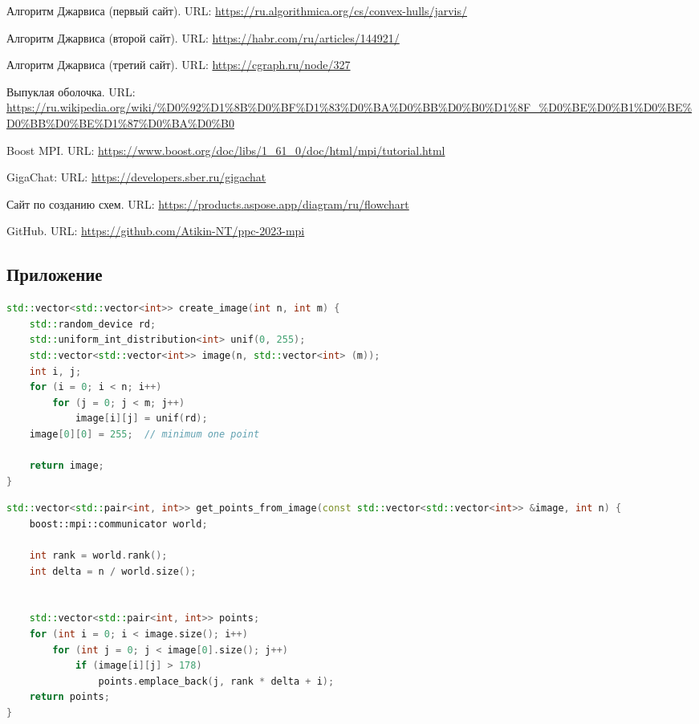 \documentclass[a4paper, 12pt]{article}
\begin{document}
\begin{thebibliography}{8}
Алгоритм Джарвиса (первый сайт). URL: \url{https://ru.algorithmica.org/cs/convex-hulls/jarvis/}

Алгоритм Джарвиса (второй сайт). URL: \url{https://habr.com/ru/articles/144921/}

Алгоритм Джарвиса (третий сайт). URL: \url{https://cgraph.ru/node/327}

Выпуклая оболочка. URL: \url{https://ru.wikipedia.org/wiki/%D0%92%D1%8B%D0%BF%D1%83%D0%BA%D0%BB%D0%B0%D1%8F_%D0%BE%D0%B1%D0%BE%D0%BB%D0%BE%D1%87%D0%BA%D0%B0}

Boost MPI. URL: \url{https://www.boost.org/doc/libs/1_61_0/doc/html/mpi/tutorial.html}

GigaChat: URL: \url{https://developers.sber.ru/gigachat}

Сайт по созданию схем. URL: \url{https://products.aspose.app/diagram/ru/flowchart}

GitHub. URL: \url{https://github.com/Atikin-NT/ppc-2023-mpi}
\end{thebibliography}

\newpage
\begin{center}
    \section{Приложение}
\end{center}

\begin{lstlisting}[language=C++,caption=Создание изображения]
std::vector<std::vector<int>> create_image(int n, int m) {
    std::random_device rd;
    std::uniform_int_distribution<int> unif(0, 255);
    std::vector<std::vector<int>> image(n, std::vector<int> (m));
    int i, j;
    for (i = 0; i < n; i++)
        for (j = 0; j < m; j++)
            image[i][j] = unif(rd);
    image[0][0] = 255;  // minimum one point

    return image;
}
\end{lstlisting}

\bigbreak

\begin{lstlisting}[language=C++,caption=Бинаризация изображения]
std::vector<std::pair<int, int>> get_points_from_image(const std::vector<std::vector<int>> &image, int n) {
    boost::mpi::communicator world;

    int rank = world.rank();
    int delta = n / world.size();


    std::vector<std::pair<int, int>> points;
    for (int i = 0; i < image.size(); i++)
        for (int j = 0; j < image[0].size(); j++)
            if (image[i][j] > 178)
                points.emplace_back(j, rank * delta + i);
    return points;
}
\end{lstlisting}
\end{document}
